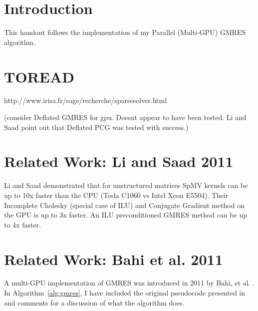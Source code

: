 \section{Introduction}
This handout follows the implementation of my Parallel (Multi-GPU) GMRES algorithm. 

\section{TOREAD} 

http://www.irisa.fr/sage/recherche/sparsesolver.html

(consider Deflated GMRES for gpu. Doesnt appear to have been tested. Li and Saad point out that Deflated PCG was tested with success.)

\section{Related Work: Li and Saad 2011} 

Li and Saad demonstrated that for unstructured matrices SpMV kernels can be up to 10x faster than the CPU (Tesla C1060 vs Intel Xeon E5504). 
Their Incomplete Cholesky (special case of ILU) and Conjugate Gradient method on the GPU is up to 3x faster. 
An ILU preconditioned GMRES method can be up to 4x faster. 


\section{Related Work: Bahi et al. 2011}
A multi-GPU implementation of GMRES was introduced in 2011 by Bahi, et al. \cite{Bahi2011}. In Algorithm~\ref{alg:gmres}, I have included the original pseudocode presented in \cite{Bahi2011} and {\color{blue}comments} for a discussion of what the algorithm does. 

